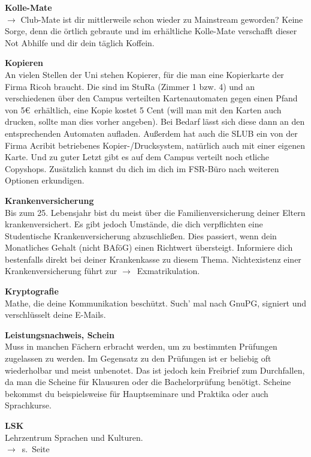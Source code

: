 \begin{multicols}{2}
\vfill\columnbreak%

\textbf{Kolle-Mate}\\
$\rightarrow$ Club-Mate ist dir mittlerweile schon wieder zu Mainstream geworden? Keine Sorge, denn die örtlich gebraute und im \ascii{} erhältliche Kolle-Mate verschafft dieser Not Abhilfe und dir dein täglich Koffein.

\textbf{Kopieren} \\
An vielen Stellen der Uni stehen Kopierer, für die man eine Kopierkarte der Firma Ricoh braucht. Die sind im StuRa (Zimmer 1 bzw. 4) und an verschiedenen über den Campus verteilten Kartenautomaten gegen einen Pfand von 5\euro\ erhältlich, eine Kopie kostet 5 Cent (will man mit den Karten auch drucken, sollte man dies vorher angeben).
Bei Bedarf lässt sich diese dann an den entsprechenden Automaten aufladen.
Außerdem hat auch die SLUB ein von der Firma Acribit betriebenes Kopier-/Drucksystem, natürlich auch mit einer eigenen Karte.
Und zu guter Letzt gibt es auf dem Campus verteilt noch etliche Copyshops.
Zusätzlich kannst du dich im dich im FSR-Büro nach weiteren Optionen erkundigen.

\textbf{Krankenversicherung} \\
Bis zum 25. Lebensjahr bist du meist über die Familienversicherung deiner Eltern krankenversichert.
Es gibt jedoch Umstände, die dich verpflichten eine Studentische Krankenversicherung abzuschließen.
Dies passiert, wenn dein Monatliches Gehalt (nicht BAföG) einen Richtwert übersteigt.
Informiere dich bestenfalls direkt bei deiner Krankenkasse zu diesem Thema.
Nichtexistenz einer Krankenversicherung führt zur \mbox{$\rightarrow$~Exmatrikulation}.

\vfill\columnbreak%

\textbf{Kryptografie} \\
Mathe, die deine Kommunikation beschützt.
Such' mal nach GnuPG, signiert und verschlüsselt deine E-Mails.

\textbf{Leistungsnachweis, Schein} \\
Muss in manchen Fächern erbracht werden, um zu bestimmten Prüfungen zugelassen zu werden.
Im Gegensatz zu den Prüfungen ist er beliebig oft wiederholbar und meist unbenotet.
Das ist jedoch kein Freibrief zum Durchfallen, da man die Scheine für Klausuren oder die Bachelorprüfung benötigt.
Scheine bekommst du beispielsweise für Hauptseminare und Praktika oder auch Sprachkurse.

\textbf{LSK} \\
Lehrzentrum Sprachen und Kulturen.\\
$\rightarrow$~s.~Seite~\pageref{sec:sprachausbildung}


\end{multicols}
